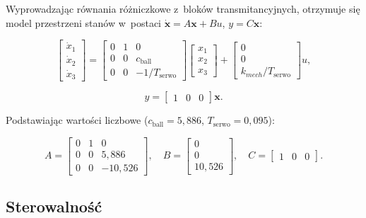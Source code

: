 Wyprowadzając równania różniczkowe z~bloków transmitancyjnych, otrzymuje się model
przestrzeni stanów w~postaci $\dot{\mathbf{x}} = A\mathbf{x} + Bu$, $y = C\mathbf{x}$:

\begin{equation}
  \begin{bmatrix} \dot{x}_1 \\ \dot{x}_2 \\ \dot{x}_3 \end{bmatrix}
  =
  \begin{bmatrix} 0 & 1 & 0 \\ 0 & 0 & c_{\mathrm{ball}} \\ 0 & 0 & -1/T_{\mathrm{serwo}} \end{bmatrix}
  \begin{bmatrix} x_1 \\ x_2 \\ x_3 \end{bmatrix}
  +
  \begin{bmatrix} 0 \\ 0 \\ k_{mech}/T_{\mathrm{serwo}} \end{bmatrix} u,
  \label{eq:statespace}
\end{equation}

\begin{equation}
  y = \begin{bmatrix} 1 & 0 & 0 \end{bmatrix} \mathbf{x}.
\end{equation}

Podstawiając wartości liczbowe ($c_{\mathrm{ball}} = 5{,}886$, $T_{\mathrm{serwo}} = 0{,}095$):

\begin{equation}
  A = \begin{bmatrix} 0 & 1 & 0 \\ 0 & 0 & 5{,}886 \\ 0 & 0 & -10{,}526 \end{bmatrix},
  \quad
  B = \begin{bmatrix} 0 \\ 0 \\ 10{,}526 \end{bmatrix},
  \quad
  C = \begin{bmatrix} 1 & 0 & 0 \end{bmatrix}.
\end{equation}

\subsection{Sterowalność}

